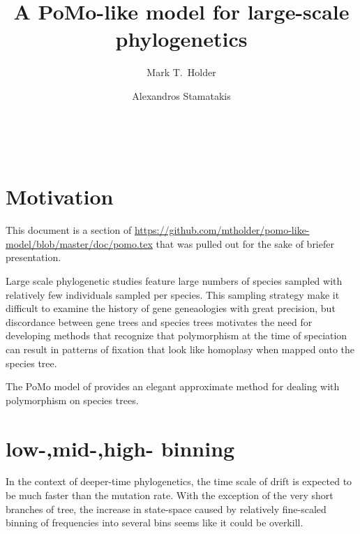 \documentclass{llncs}
\newcommand{\pomo}{PoMo\xspace}
\begin{document}
\title{A \pomo-like model for large-scale phylogenetics}
\author{Mark T.~Holder\and Alexandros Stamatakis}
\\
\newcommand\enum{\addtocounter{equation}{1}\tag{\theequation}}
\maketitle              %
\section {Motivation}
This document is a section of \url{https://github.com/mtholder/pomo-like-model/blob/master/doc/pomo.tex}
that was pulled out for the sake of briefer presentation.

Large scale phylogenetic studies feature large numbers of species sampled with relatively few
    individuals sampled per species.
This sampling strategy make it difficult to examine the history of gene geneaologies with great precision, but 
    discordance between gene trees and species trees motivates the need for developing methods
    that recognize that polymorphism at the time of speciation can result in patterns of fixation
    that look like homoplasy when mapped onto the species tree.

The \pomo model of \cite{DeMaioSK2013} provides an elegant approximate method for dealing with polymorphism 
    on species trees.
\section*{low-,mid-,high- binning}
In the context of deeper-time phylogenetics, the time scale of drift
    is expected to be much faster than the mutation rate.
With the exception of the very short branches of tree, the increase
    in state-space caused by relatively fine-scaled binning of frequencies
    into several bins seems like it could be overkill.
\end{document}
